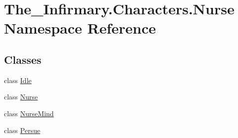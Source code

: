\hypertarget{namespace_the___infirmary_1_1_characters_1_1_nurse}{}\section{The\+\_\+\+Infirmary.\+Characters.\+Nurse Namespace Reference}
\label{namespace_the___infirmary_1_1_characters_1_1_nurse}
\subsection*{Classes}
\begin{DoxyCompactItemize}
\item 
class \mbox{\hyperlink{class_the___infirmary_1_1_characters_1_1_nurse_1_1_idle}{Idle}}
\item 
class \mbox{\hyperlink{class_the___infirmary_1_1_characters_1_1_nurse_1_1_nurse}{Nurse}}
\item 
class \mbox{\hyperlink{class_the___infirmary_1_1_characters_1_1_nurse_1_1_nurse_mind}{Nurse\+Mind}}
\item 
class \mbox{\hyperlink{class_the___infirmary_1_1_characters_1_1_nurse_1_1_persue}{Persue}}
\end{DoxyCompactItemize}
